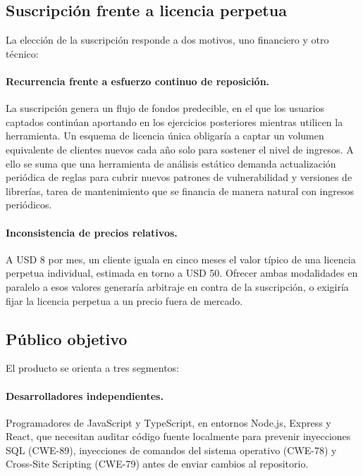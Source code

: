 \subsection{Suscripción frente a licencia perpetua}\label{sec:n5.1.1}

La elección de la suscripción responde a dos motivos, uno financiero y otro técnico:

\paragraph{Recurrencia frente a esfuerzo continuo de reposición.} La suscripción genera un flujo de fondos predecible, en el que los usuarios captados continúan aportando en los ejercicios posteriores mientras utilicen la herramienta. Un esquema de licencia única obligaría a captar un volumen equivalente de clientes nuevos cada año solo para sostener el nivel de ingresos. A ello se suma que una herramienta de análisis estático demanda actualización periódica de reglas para cubrir nuevos patrones de vulnerabilidad y versiones de librerías, tarea de mantenimiento que se financia de manera natural con ingresos periódicos.

\paragraph{Inconsistencia de precios relativos.} A USD 8 por mes, un cliente iguala en cinco meses el valor típico de una licencia perpetua individual, estimada en torno a USD 50. Ofrecer ambas modalidades en paralelo a esos valores generaría arbitraje en contra de la suscripción, o exigiría fijar la licencia perpetua a un precio fuera de mercado.

\subsection{Público objetivo}\label{sec:n5.1.2}

El producto se orienta a tres segmentos:

\paragraph{Desarrolladores independientes.} Programadores de JavaScript y TypeScript, en entornos Node.js, Express y React, que necesitan auditar código fuente localmente para prevenir inyecciones SQL (CWE-89), inyecciones de comandos del sistema operativo (CWE-78) y Cross-Site Scripting (CWE-79) antes de enviar cambios al repositorio.


